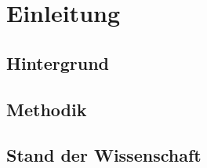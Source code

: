 \chapter{Einleitung}
	\section{Hintergrund}
	
	\section{Methodik}
	
	\section{Stand der Wissenschaft}

